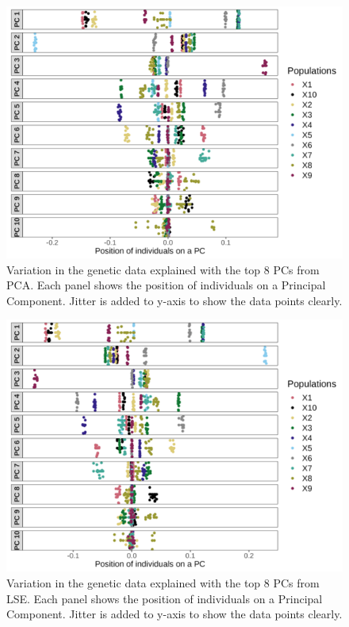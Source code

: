 \documentclass[12pt, letterpaper]{article}
\begin{document}
\begin{figure}[ht!]
    \includegraphics[width=16.5cm]{plots/supplementary/pcaplot2.png}
    \centering
    \caption{Variation in the genetic data explained with the top 8 PCs from PCA. Each panel shows the position of individuals on a Principal Component. Jitter is added to y-axis to show the data points clearly.}
    \label{figS1:pc_scale}
\end{figure}

\begin{figure}[ht!]
    \includegraphics[width=16.5cm]{plots/supplementary/lseplot2.png}
    \centering
    \caption{Variation in the genetic data explained with the top 8 PCs from LSE. Each panel shows the position of individuals on a Principal Component. Jitter is added to y-axis to show the data points clearly.}
    \label{figS1:pc_scale}
\end{figure}
\end{document}
